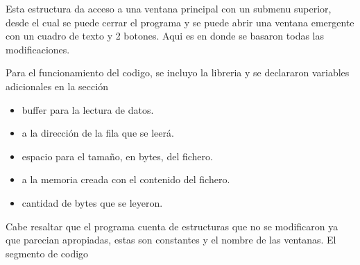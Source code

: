 Esta estructura da acceso a una ventana principal con un submenu superior, desde
el cual se puede cerrar el programa y se puede abrir una ventana emergente con un
cuadro de texto y 2 botones. Aqui es en donde se basaron todas las modificaciones.


Para el funcionamiento del codigo, se incluyo la libreria  y se
declararon variables adicionales en la sección 


\begin{itemize}
    \item {} buffer para la lectura de datos.

    \item {}  a la dirección de la fila que se
        leerá.

    \item {} espacio para el tamaño, en bytes, del fichero.

    \item {}  a la memoria creada con el contenido
        del fichero.

    \item {} cantidad de bytes que se leyeron.

\end{itemize}



Cabe resaltar que el programa cuenta de estructuras que no se modificaron ya que
parecian apropiadas, estas son constantes y el nombre de las ventanas. El segmento
 de codigo
